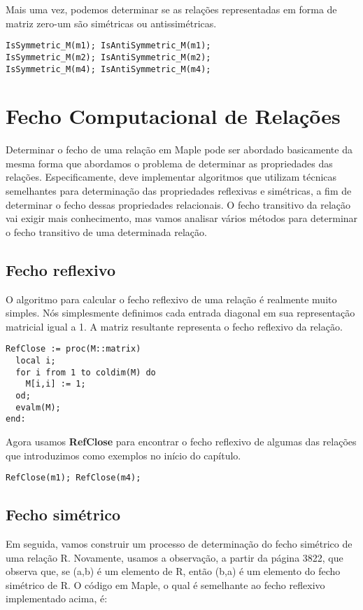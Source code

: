 \documentclass[a4paper]{article}
\begin{document}
Mais uma vez, podemos determinar se as relações representadas em forma de matriz zero-um são simétricas ou antissimétricas.

\begin{lstlisting}
IsSymmetric_M(m1); IsAntiSymmetric_M(m1);
IsSymmetric_M(m2); IsAntiSymmetric_M(m2);
IsSymmetric_M(m4); IsAntiSymmetric_M(m4);
\end{lstlisting}

\section{Fecho Computacional de Relações}
Determinar o fecho de uma relação em Maple pode ser abordado basicamente da mesma forma que abordamos o problema de determinar as propriedades das relações. Especificamente, deve implementar algoritmos que utilizam técnicas semelhantes para determinação das propriedades reflexivas e simétricas, a fim de determinar o fecho dessas propriedades relacionais. O fecho transitivo da relação vai exigir mais conhecimento, mas vamos analisar vários métodos para determinar o fecho transitivo de uma determinada relação.

\subsection{Fecho reflexivo}
O algoritmo para calcular o fecho reflexivo de uma relação é realmente muito simples. Nós simplesmente definimos cada entrada diagonal em sua representação matricial igual a 1. A matriz resultante representa o fecho reflexivo da relação.

\begin{lstlisting}
RefClose := proc(M::matrix)
  local i;
  for i from 1 to coldim(M) do
    M[i,i] := 1;
  od;
  evalm(M);
end:
\end{lstlisting}

Agora usamos \textbf{RefClose} para encontrar o fecho reflexivo de algumas das relações que introduzimos como exemplos no início do capítulo.

\begin{lstlisting}
RefClose(m1); RefClose(m4);
\end{lstlisting}

\subsection{Fecho simétrico}
Em seguida, vamos construir um processo de determinação do fecho simétrico de uma relação R. Novamente, usamos a observação, a partir da página 3822, que observa que, se (a,b) é um elemento de R, então (b,a) é um elemento do fecho simétrico de R. O código em Maple, o qual é semelhante ao fecho reflexivo implementado acima, é:
\end{document}

